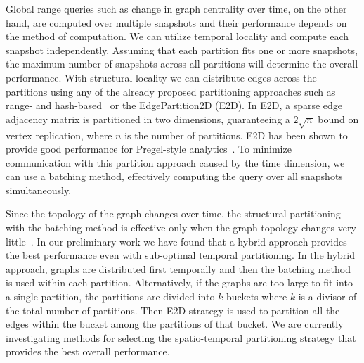 Global range queries such as change in graph centrality over time, on
the other hand, are computed over multiple snapshots and their
performance depends on the method of computation.  We can utilize
temporal locality and compute each snapshot independently.  Assuming
that each partition fits one or more snapshots, the maximum number of
snapshots across all partitions will determine the overall
performance.  With structural locality we can distribute edges across
the partitions using any of the already proposed partitioning
approaches such as range- and hash-based~\cite{Seo2013} or the
EdgePartition2D (E2D).  In E2D, a sparse edge adjacency matrix is
partitioned in two dimensions, guaranteeing a $2 \sqrt{n}$ bound on
vertex replication, where $n$ is the number of partitions. E2D has
been shown to provide good performance for Pregel-style
analytics~\cite{DBLP:conf/osdi/GonzalezXDCFS14}.  To minimize
communication with this partition approach caused by the time
dimension, we can use a batching method, effectively computing the
query over all snapshots simultaneously.  

Since the topology of the graph changes over time, the structural
partitioning with the batching method is effective only when the graph
topology changes very little~\cite{MoffittTempWeb16}.  In our
preliminary work we have found that a hybrid approach provides the
best performance even with sub-optimal temporal partitioning.  In the
hybrid approach, graphs are distributed first temporally and then the
batching method is used within each partition.  Alternatively, if the
graphs are too large to fit into a single partition, the partitions
are divided into $k$ buckets where $k$ is a divisor of the total
number of partitions.  Then E2D strategy is used to partition all the
edges within the bucket among the partitions of that bucket.  We are
currently investigating methods for selecting the spatio-temporal
partitioning strategy that provides the best overall performance.
